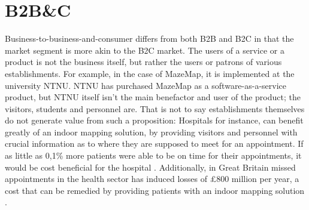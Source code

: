 \section{B2B\&C}
Business-to-business-and-consumer differs from both B2B and B2C in that the market segment is more akin to the B2C market. The users of a service or a product is not the business itself, but rather the users or patrons of various establishments. For example, in the case of MazeMap, it is implemented at the university NTNU. NTNU has purchased MazeMap as a software-as-a-service product, but NTNU itself isn't the main benefactor and user of the product; the visitors, students and personnel are. That is not to say establishments themselves do not generate value from such a proposition: Hospitals for instance, can benefit greatly of an indoor mapping solution, by providing visitors and personnel with crucial information as to where they are supposed to meet for an appointment. If as little as 0,1\% more patients were able to be on time for their appointments, it would be cost beneficial for the hospital \cite{mazemaphospitals2015}. Additionally, in Great Britain missed appointments in the health sector has induced losses of £800 million per year, a cost that can be remedied by providing patients with an indoor mapping solution \cite{lucyjohnston2012}.

